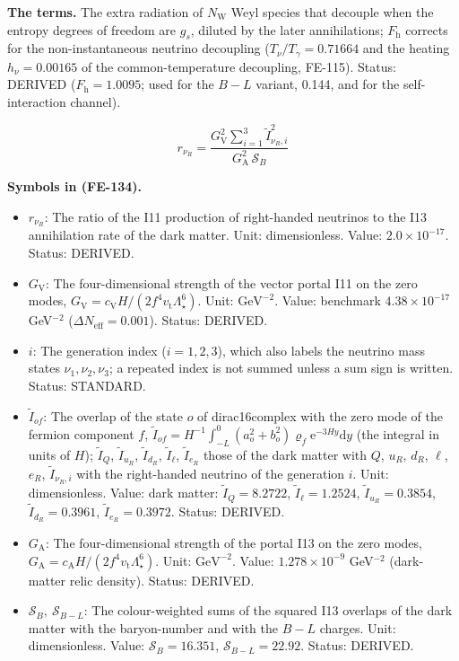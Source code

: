\documentclass[
  10pt,
]{article}
\providecommand{\tightlist}{%
  \setlength{\itemsep}{0pt}\setlength{\parskip}{0pt}}
\begin{document}
\textbf{The terms.} The extra radiation of \(N_{\mathrm{W}}\) Weyl
species that decouple when the entropy degrees of freedom are \(g_s\),
diluted by the later annihilations; \(F_{\mathrm{h}}\) corrects for the
non-instantaneous neutrino decoupling (\(T_\nu/T_\gamma = 0.71664\) and
the heating \(h_\nu = 0.00165\) of the common-temperature decoupling,
FE-115). Status: DERIVED (\(F_{\mathrm{h}} = 1.0095\); used for the
\(B - L\) variant, 0.144, and for the self-interaction channel).

\[
r_{\nu_R} = \frac{G_{\mathrm{V}}^2\sum_{i=1}^{3}\tilde I_{\nu_R,i}^2}{G_{\mathrm{A}}^2\,\mathcal{S}_B}
 \tag{FE-134}
\]

\textbf{Symbols in (FE-134).}

\begin{itemize}
\tightlist
\item
  \(r_{\nu_R}\): The ratio of the I11 production of right-handed
  neutrinos to the I13 annihilation rate of the dark matter. Unit:
  dimensionless. Value: \(2.0\times10^{-17}\). Status: DERIVED.
\item
  \(G_{\mathrm{V}}\): The four-dimensional strength of the vector portal
  I11 on the zero modes,
  \(G_{\mathrm{V}} = c_{\mathrm{V}}H/(2f^4v_{\mathrm{t}}\Lambda_\star^6)\).
  Unit: \(\mathrm{GeV}^{-2}\). Value: benchmark \(4.38\times10^{-17}\)
  GeV\(^{-2}\) (\(\Delta N_{\mathrm{eff}} = 0.001\)). Status: DERIVED.
\item
  \(i\): The generation index (\(i = 1, 2, 3\)), which also labels the
  neutrino mass states \(\nu_1, \nu_2, \nu_3\); a repeated index is not
  summed unless a sum sign is written. Status: STANDARD.
\item
  \(\tilde I_{of}\): The overlap of the state \(o\) of dirac16complex
  with the zero mode of the fermion component \(f\),
  \(\tilde I_{of} = H^{-1}\int_{-L}^{0}(a_o^2 + b_o^2)\varrho_f\mathrm{e}^{-3Hy}\mathrm{d}y\)
  (the integral in units of \(H\)); \(\tilde I_Q\), \(\tilde I_{u_R}\),
  \(\tilde I_{d_R}\), \(\tilde I_\ell\), \(\tilde I_{e_R}\) those of the
  dark matter with \(Q\), \(u_R\), \(d_R\), \(\ell\), \(e_R\),
  \(\tilde I_{\nu_R,i}\) with the right-handed neutrino of the
  generation \(i\). Unit: dimensionless. Value: dark matter:
  \(\tilde I_Q = 8.2722\), \(\tilde I_\ell = 1.2524\),
  \(\tilde I_{u_R} = 0.3854\), \(\tilde I_{d_R} = 0.3961\),
  \(\tilde I_{e_R} = 0.3972\). Status: DERIVED.
\item
  \(G_{\mathrm{A}}\): The four-dimensional strength of the portal I13 on
  the zero modes,
  \(G_{\mathrm{A}} = c_{\mathrm{A}}H/(2f^4v_{\mathrm{t}}\Lambda_\star^6)\).
  Unit: \(\mathrm{GeV}^{-2}\). Value: \(1.278\times10^{-9}\)
  GeV\(^{-2}\) (dark-matter relic density). Status: DERIVED.
\item
  \(\mathcal{S}_B,\ \mathcal{S}_{B-L}\): The colour-weighted sums of the
  squared I13 overlaps of the dark matter with the baryon-number and
  with the \(B - L\) charges. Unit: dimensionless. Value:
  \(\mathcal{S}_B = 16.351\), \(\mathcal{S}_{B-L} = 22.92\). Status:
  DERIVED.
\end{itemize}
\end{document}
